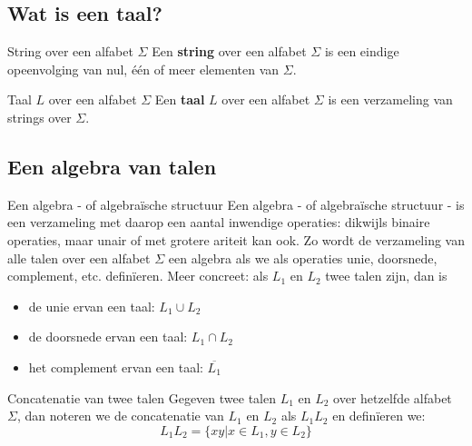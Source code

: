 \subsection{Wat is een taal?}

\vspace{0.5cm}

\begin{theo}{String over een alfabet $\Sigma$}
    Een \textbf{string} over een alfabet $\Sigma$ is een eindige opeenvolging van nul, één of meer elementen van $\Sigma$.
\end{theo}

\begin{theo}{Taal $L$ over een alfabet $\Sigma$}
    Een \textbf{taal} $L$ over een alfabet $\Sigma$ is een verzameling van strings over $\Sigma$.
\end{theo}

\subsection{Een algebra van talen}

\vspace{0.5cm}

\begin{theo}{Een algebra - of algebraïsche structuur}
    Een algebra - of algebraïsche structuur - is een verzameling met daarop een aantal inwendige operaties:
    dikwijls binaire operaties, maar unair of met grotere ariteit kan ook. Zo wordt de verzameling van
    alle talen over een alfabet $\Sigma$ een algebra als we als operaties unie, doorsnede, complement, etc. definïeren.
    Meer concreet: als $L_1$ en $L_2$ twee talen zijn, dan is
    \begin{itemize}
        \item de unie ervan een taal: $L_1 \cup L_2$
        \item de doorsnede ervan een taal: $L_1 \cap L_2$
        \item het complement ervan een taal: $\overline{L_1}$
    \end{itemize}
\end{theo}

\begin{pro}{Concatenatie van twee talen}
    Gegeven twee talen $L_1$ en $L_2$ over hetzelfde alfabet $\Sigma$, dan noteren we de concatenatie van
    $L_1$ en $L_2$ als $L_1L_2$ en definïeren we:
    \begin{equation*}
        L_{1}L_{2} = \{ xy | x \in L_1, y \in L_2\}
    \end{equation*}
    \vspace{-0.3cm}
\end{pro}

